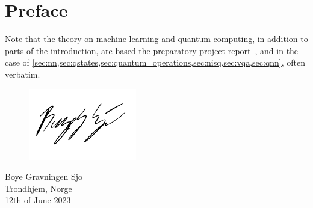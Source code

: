 \chapter{Preface}
\lipsum[1]

Note that the theory on machine learning and quantum computing, in addition to parts of the introduction, are based the preparatory project report~\autocite{sjo2022}, and in the case of \cref{sec:nn,sec:qstates,sec:quantum_operations,sec:nisq,sec:vqa,sec:qnn}, often verbatim.

\vspace{1.5cm}
\begin{figure}[h]
  \raggedleft
  \includegraphics[width=0.3\linewidth]{blank.pdf}
\end{figure}
\begin{flushright}
  \vspace{-1.3cm}
  Boye Gravningen Sjo \\
  Trondhjem, Norge \\
  12th of June 2023
\end{flushright}

\cleardoublepage